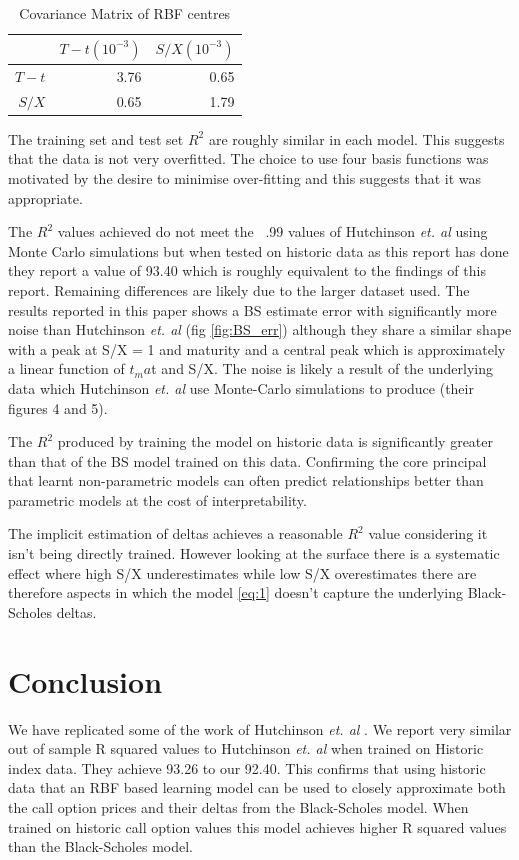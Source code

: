 \documentclass{sig-alternate-05-2015}
\begin{document}
\begin{table}[ht]
\centering
\begin{tabular}{rrr}
  \hline
 & $T-t (10^{-3})$ & $S/X (10^{-3})$ \\ 
  \hline
 $T-t$ & 3.76 & 0.65 \\ 
  $S/X$ & 0.65 & 1.79 \\ 
   \hline
\end{tabular}
\caption{Covariance Matrix of RBF centres}
\end{table}


The training set and test set $R^2$ are roughly similar in each model. This suggests that the data is not very overfitted. The choice to use four basis functions was motivated by the desire to minimise over-fitting and this suggests that it was appropriate. 

The $R^2$ values achieved do not meet the ~.99 values of Hutchinson \textit{et. al} using Monte Carlo simulations but when tested on historic data as this report has done they report a value of 93.40 which is roughly equivalent to the findings of this report. Remaining differences are likely due to the larger dataset used. The results reported in this paper shows a BS estimate error with significantly more noise than Hutchinson \textit{et. al} (fig \ref{fig:BS_err}) although they share a similar shape with a peak at S/X = 1 and maturity and a central peak which is approximately a linear function of $t_ma$t and S/X. The noise is likely a result of the underlying data which Hutchinson \textit{et. al} use Monte-Carlo simulations to produce (their figures 4 and 5). 

The $R^2$ produced by training the model on historic data is significantly greater than that of the BS model trained on this data. Confirming the core principal that learnt non-parametric models can often predict relationships better than parametric models at the cost of interpretability.  

The implicit estimation of deltas achieves a reasonable $R^2$ value considering it isn't being directly trained. However looking at the surface there is a systematic effect where high S/X underestimates while low S/X overestimates there are therefore aspects in which the model \eqref{eq:1} doesn't capture the underlying Black-Scholes deltas. 


\section{Conclusion}
We have replicated some of the work of Hutchinson \textit{et. al} \cite{hutchinson1994nonparametric}. We report very similar out of sample R squared values to Hutchinson \textit{et. al} when trained on Historic index data. They achieve 93.26 to our 92.40. This confirms that using historic data that an RBF based learning model can be used to closely approximate both the call option prices and their deltas from the Black-Scholes model. When trained on historic call option values this model achieves higher R squared values than the Black-Scholes model. 
\end{document}
